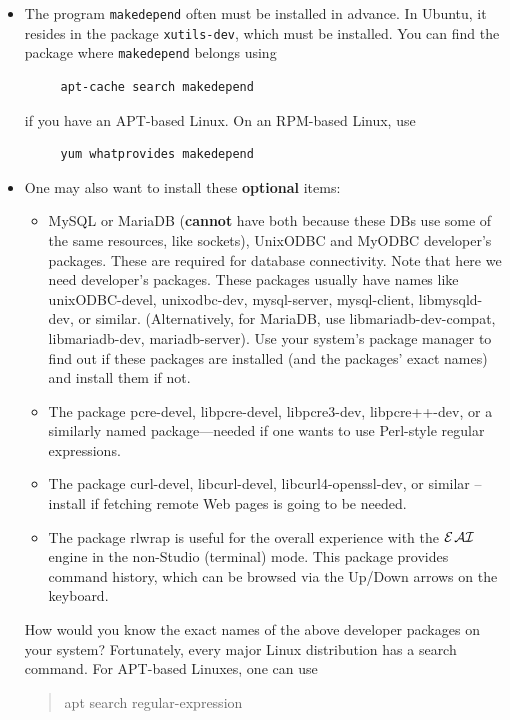 \documentclass[11pt]{article}
\newcommand{\ERGOAI}{\mbox{{\ensuremath{\cal{E}}\smaller{{\sc{RGO}}}}\ensuremath{\cal{AI}}}\xspace}
\begin{document}
\begin{itemize}
\begin{itemize}
    \item The program \texttt{makedepend} often must be installed in advance.
      In Ubuntu, it resides in the package \texttt{xutils-dev}, which must
      be installed. You can find the package where \texttt{makedepend}
      belongs using
\begin{verbatim}
     apt-cache search makedepend
\end{verbatim}
      if you have an APT-based Linux. On an RPM-based Linux, use
\begin{verbatim}
     yum whatprovides makedepend
\end{verbatim}
  \item  One may also want to install these \textbf{optional} items:
    \begin{itemize}
    \item MySQL or MariaDB (\textbf{cannot} have both
      because these DBs use some of
      the same resources, like sockets), UnixODBC and MyODBC developer's packages. These are required
      for database connectivity. Note that here we need developer's
      packages. These packages usually have names like unixODBC-devel,
      unixodbc-dev, mysql-server, mysql-client,
      libmysqld-dev,
      or similar.
      (Alternatively, for MariaDB, use libmariadb-dev-compat, libmariadb-dev,
      mariadb-server).
      Use your system's package manager to find out if these packages are
      installed (and the packages' exact names) and install them if not.
    \item The package pcre-devel, libpcre-devel, libpcre3-dev, libpcre++-dev, or a similarly
      named package---needed if one wants to use Perl-style regular
      expressions.
    \item The package curl-devel, libcurl-devel, libcurl4-openssl-dev, or
      similar -- install if fetching remote Web pages is going to be needed.
    \item The package rlwrap is useful for the overall experience with the
      \ERGOAI engine in the non-Studio (terminal) mode. This package provides
      command history, which can be browsed via the Up/Down arrows on the
      keyboard.
    \end{itemize}
    How would you know the exact names of the above developer packages on
    your system? Fortunately, every major Linux distribution has a search
    command. For APT-based Linuxes, one can use 
    \begin{quote}
      apt search regular-expression     

\end{quote}
\end{itemize}
\end{itemize}
\end{document}
